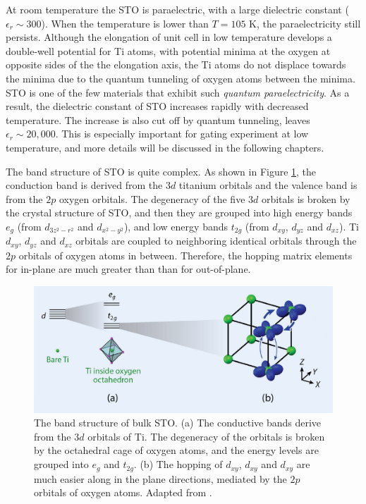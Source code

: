 \documentclass[pdflatex, sectionletters, 12pt]{pittetd}    %
\begin{document}
At room temperature the STO is paraelectric, with a large dielectric constant ($\epsilon_r \sim 300$).  When the temperature is lower than $T=105$ K, the paraelectricity still persists. Although the elongation of unit cell in low temperature develops a double-well potential for Ti atoms, with potential minima at the oxygen at opposite sides of the the elongation axis, the Ti atoms do not displace towards the minima due to the quantum tunneling of oxygen atoms\cite{sulpizio2014nanoscale} between the minima. STO is one of the few materials that exhibit such \emph{quantum paraelectricity}\cite{muller1979srti}. As a result, the dielectric constant of STO increases rapidly with decreased temperature. The increase is also cut off by quantum tunneling, leaves $\epsilon_r \sim 20,000$\cite{sakudo1971dielectric}. This is especially important for gating experiment at low temperature, and more details will be discussed in the following chapters.

The band structure of STO is quite complex. As shown in Figure \ref{FIG:STOBand}, the conduction band is derived from the $3d$ titanium orbitals and the valence band is from the $2p$ oxygen orbitals. The degeneracy of the five $3d$ orbitals is broken by the crystal structure of STO, and then they are grouped into high energy bands $e_g$ (from $d_{3z^2 - r^2}$ and $d_{x^2-y^2}$), and low energy bands $t_{2g}$ (from $d_{xy}$, $d_{yz}$ and $d_{xz}$). Ti $d_{xy}$, $d_{yz}$ and $d_{xz}$ orbitals are coupled to neighboring identical orbitals through the $2p$ orbitals of oxygen atoms in between. Therefore, the hopping matrix elements for in-plane are much greater than than for out-of-plane. 

\begin{figure}[h!]
	\centering
	\includegraphics[width=.90\textwidth]{Drawing/STOBand.pdf}
	\caption{The band structure of bulk STO. (a) The conductive bands derive from the $3d$ orbitals of Ti. The degeneracy of the orbitals is broken by the octahedral cage of oxygen atoms, and the energy levels are grouped into $e_g$ and $t_{2g}$. (b) The hopping of $d_{xy}$, $d_{xy}$ and $d_{xy}$ are much easier along in the plane directions, mediated by the $2p$ orbitals of oxygen atoms. Adapted from \cite{sulpizio2014nanoscale}.}
	\label{FIG:STOBand}
\end{figure}
\end{document}
